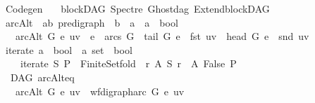 %
\begin{isabellebody}%
%
%
\isadelimtheory
\isanewline
\isanewline
\isanewline
%
\endisadelimtheory
%
\isatagtheory
{}\isamarkupfalse%
\ Codegen\isanewline
\ \ \ blockDAG\ Spectre\ Ghostdag\ Extend{\isacharunderscore}{\kern0pt}blockDAG\ \isanewline
{}%
\endisatagtheory
{\isafoldtheory}%
%
\isadelimtheory
%
\endisadelimtheory
%
\isadelimdocument
%
\endisadelimdocument
%
\isatagdocument
%
\isamarkuptrue%
%
\endisatagdocument
{\isafolddocument}%
%
\isadelimdocument
%
\endisadelimdocument
{}\isamarkupfalse%
\ arcAlt{\isacharcolon}{\kern0pt}{\isacharcolon}{\kern0pt}\ \ {\isachardoublequoteopen}{\isacharparenleft}{\kern0pt}{\isacharprime}{\kern0pt}a{\isacharcomma}{\kern0pt}{\isacharprime}{\kern0pt}b{\isacharparenright}{\kern0pt}\ pre{\isacharunderscore}{\kern0pt}digraph\ {\isasymRightarrow}\ {\isacharprime}{\kern0pt}b\ {\isasymRightarrow}\ {\isacharprime}{\kern0pt}a\ {\isasymtimes}\ {\isacharprime}{\kern0pt}a\ {\isasymRightarrow}\ bool{\isachardoublequoteclose}\isanewline
\ \ \ {\isachardoublequoteopen}arcAlt\ G\ e\ uv\ {\isacharequal}{\kern0pt}\ {\isacharparenleft}{\kern0pt}e\ {\isasymin}\ arcs\ G\ {\isasymand}\ tail\ G\ e\ {\isacharequal}{\kern0pt}\ fst\ uv\ {\isasymand}\ head\ G\ e\ {\isacharequal}{\kern0pt}\ snd\ uv{\isacharparenright}{\kern0pt}{\isachardoublequoteclose}\isanewline
\isanewline
{}\isamarkupfalse%
\ iterate{\isacharcolon}{\kern0pt}{\isacharcolon}{\kern0pt}\ {\isachardoublequoteopen}{\isacharparenleft}{\kern0pt}{\isacharprime}{\kern0pt}a\ {\isasymRightarrow}\ bool{\isacharparenright}{\kern0pt}\ {\isasymRightarrow}\ {\isacharprime}{\kern0pt}a\ set\ {\isasymRightarrow}\ bool{\isachardoublequoteclose}\isanewline
\ \ \ \ {\isachardoublequoteopen}iterate\ S\ P\ {\isacharequal}{\kern0pt}\ Finite{\isacharunderscore}{\kern0pt}Set{\isachardot}{\kern0pt}fold\ {\isacharparenleft}{\kern0pt}{\isasymlambda}\ r\ A{\isachardot}{\kern0pt}\ S\ r\ {\isasymand}\ A{\isacharparenright}{\kern0pt}\ False\ P\ {\isachardoublequoteclose}\isanewline
\isanewline
{}\isamarkupfalse%
\ {\isacharparenleft}{\kern0pt}\ DAG{\isacharparenright}{\kern0pt}\ arcAlt{\isacharunderscore}{\kern0pt}eq{\isacharcolon}{\kern0pt}\ \ \ \ \ \ \ \ \ \ \ \ \ \ \ \ \ \ \ \ \ \isanewline
\ \ \ {\isachardoublequoteopen}arcAlt\ G\ e\ uv\ {\isacharequal}{\kern0pt}\ wf{\isacharunderscore}{\kern0pt}digraph{\isachardot}{\kern0pt}arc\ G\ e\ uv{\isachardoublequoteclose}\isanewline

\end{isabellebody}

